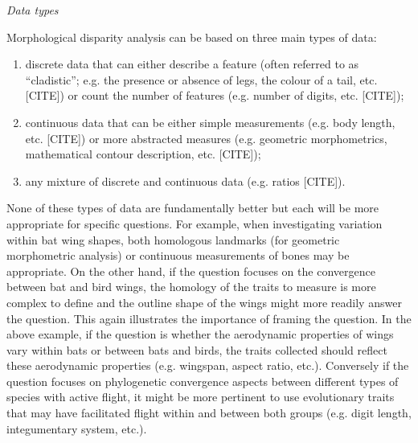 \documentclass[12pt,letterpaper]{article}
\renewcommand{\subsection}[1]{%
\bigskip
\begin{center}
\begin{large}
\normalfont\itshape #1
\end{large}
\end{center}}
\begin{document}
\subsection{Data types}
Morphological disparity analysis can be based on three main types of data:
\begin{enumerate}
    \item discrete data that can either describe a feature (often referred to as ``cladistic''; e.g. the presence or absence of legs, the colour of a tail, etc. [CITE]) or count the number of features (e.g. number of digits, etc. [CITE]);
    \item continuous data that can be either simple measurements (e.g. body length, etc. [CITE]) or more abstracted measures (e.g. geometric morphometrics, mathematical contour description, etc. [CITE]);
    \item any mixture of discrete and continuous data (e.g. ratios [CITE]).
\end{enumerate}
None of these types of data are fundamentally better but each will be more appropriate for specific questions.
For example, when investigating variation within bat wing shapes, both homologous landmarks (for geometric morphometric analysis) or continuous measurements of bones may be appropriate.
On the other hand, if the question focuses on the convergence between bat and bird wings, the homology of the traits to measure is more complex to define and the outline shape of the wings might more readily answer the question.
This again illustrates the importance of framing the question.
In the above example, if the question is whether the aerodynamic properties of wings vary within bats or between bats and birds, the traits collected should reflect these aerodynamic properties (e.g. wingspan, aspect ratio, etc.).
Conversely if the question focuses on phylogenetic convergence aspects between different types of species with active flight, it might be more pertinent to use evolutionary traits that may have facilitated flight within and between both groups (e.g. digit length, integumentary system, etc.).
\end{document}

